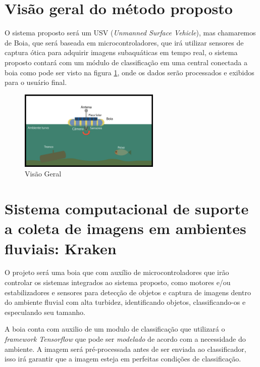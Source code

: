 \section{Visão geral do método proposto}
   
   O sistema proposto será um USV (\textit{Unmanned Surface Vehicle}), mas chamaremos de Boia, que será baseada em microcontroladores, que irá utilizar sensores de captura ótica para adquirir imagens subaquáticas em tempo real, o sistema proposto contará com um módulo de classificação em uma central conectada a boia como pode ser visto na figura \ref{fig:bigpic}, onde os dados serão processados e exibidos para o usuário final. 
   

\begin{figure}[ht]
	\centering
    \caption{\label{fig:bigpic}Visão Geral}
	\includegraphics[width = 0.6\textwidth]{resources/bugpicturefloater}
\end{figure}

\section{Sistema computacional de suporte a coleta de imagens em ambientes fluviais: Kraken}

O projeto será uma boia que com auxílio de microcontroladores que irão controlar os sistemas integrados ao sistema proposto, como motores e/ou estabilizadores e sensores para detecção de objetos e captura de imagens dentro do ambiente fluvial com alta turbidez, identificando objetos, classificando-os e especulando seu tamanho.

A boia conta com auxilio de um modulo de classificação que utilizará o \textit{framework Tensorflow} que pode ser \textit{modelado} de acordo com a necessidade do ambiente. A imagem será pré-processada antes de ser enviada ao classificador, isso irá garantir que a imagem esteja em perfeitas condições de classificação.

